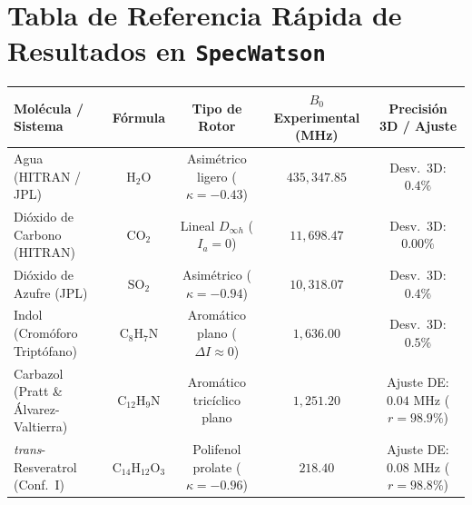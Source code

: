 \documentclass[11pt,letterpaper]{article}
\begin{document}
\section{Tabla de Referencia Rápida de Resultados en \texttt{SpecWatson}}

\begin{table}[h!]
\centering
\small
\begin{tabular}{lcccc}
\toprule
\textbf{Molécula / Sistema} & \textbf{Fórmula} & \textbf{Tipo de Rotor} & \textbf{$B_0$ Experimental (MHz)} & \textbf{Precisión 3D / Ajuste} \\
\midrule
Agua (HITRAN / JPL) & $\text{H}_2\text{O}$ & Asimétrico ligero ($\kappa=-0.43$) & $435,347.85$ & Desv.\ 3D: $0.4\%$ \\
Dióxido de Carbono (HITRAN) & $\text{CO}_2$ & Lineal $D_{\infty h}$ ($I_a=0$) & $11,698.47$ & Desv.\ 3D: $0.00\%$ \\
Dióxido de Azufre (JPL) & $\text{SO}_2$ & Asimétrico ($\kappa=-0.94$) & $10,318.07$ & Desv.\ 3D: $0.4\%$ \\
Indol (Cromóforo Triptófano) & $\text{C}_8\text{H}_7\text{N}$ & Aromático plano ($\Delta I \approx 0$) & $1,636.00$ & Desv.\ 3D: $0.5\%$ \\
Carbazol (Pratt \& Álvarez-Valtierra) & $\text{C}_{12}\text{H}_9\text{N}$ & Aromático tricíclico plano & $1,251.20$ & Ajuste DE: $0.04\text{ MHz}$ ($r=98.9\%$) \\
\textit{trans}-Resveratrol (Conf.\ I) & $\text{C}_{14}\text{H}_{12}\text{O}_3$ & Polifenol prolate ($\kappa=-0.96$) & $218.40$ & Ajuste DE: $0.08\text{ MHz}$ ($r=98.8\%$) \\
\bottomrule
\end{tabular}
\end{table}
\end{document}
